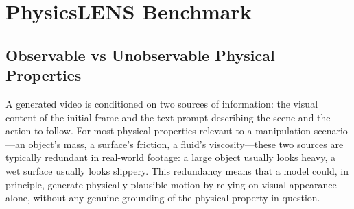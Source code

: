\documentclass{article} %
\begin{document}

\section{PhysicsLENS Benchmark}
\subsection{Observable vs Unobservable Physical Properties}
\label{sec:observability}
A generated video is conditioned on two sources of information: the visual content of the initial frame and the text prompt describing the scene and the action to follow. For most physical properties relevant to a manipulation scenario---an object's mass, a surface's friction, a fluid's viscosity---these two sources are typically redundant in real-world footage: a large object usually looks heavy, a wet surface usually looks slippery. This redundancy means that a model could, in principle, generate physically plausible motion by relying on visual appearance alone, without any genuine grounding of the physical property in question.
\end{document}

